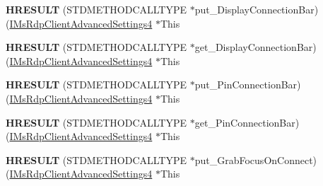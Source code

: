 \begin{DoxyCompactItemize}
\item 
\mbox{\label{struct_m_s_t_s_c_lib_1_1_i_ms_rdp_client_advanced_settings4_vtbl_abb6c86cea366f2b3b51c40e2bc275928}} 
{\bfseries H\+R\+E\+S\+U\+LT} (S\+T\+D\+M\+E\+T\+H\+O\+D\+C\+A\+L\+L\+T\+Y\+PE $\ast$put\+\_\+\+Display\+Connection\+Bar)(\hyperlink{interface_m_s_t_s_c_lib_1_1_i_ms_rdp_client_advanced_settings4}{I\+Ms\+Rdp\+Client\+Advanced\+Settings4} $\ast$This
\item 
\mbox{\label{struct_m_s_t_s_c_lib_1_1_i_ms_rdp_client_advanced_settings4_vtbl_a5d0ce8b420711beeb26fd151c7a28d4d}} 
{\bfseries H\+R\+E\+S\+U\+LT} (S\+T\+D\+M\+E\+T\+H\+O\+D\+C\+A\+L\+L\+T\+Y\+PE $\ast$get\+\_\+\+Display\+Connection\+Bar)(\hyperlink{interface_m_s_t_s_c_lib_1_1_i_ms_rdp_client_advanced_settings4}{I\+Ms\+Rdp\+Client\+Advanced\+Settings4} $\ast$This
\item 
\mbox{\label{struct_m_s_t_s_c_lib_1_1_i_ms_rdp_client_advanced_settings4_vtbl_a5540b928ca77195a141ad56ac59f7108}} 
{\bfseries H\+R\+E\+S\+U\+LT} (S\+T\+D\+M\+E\+T\+H\+O\+D\+C\+A\+L\+L\+T\+Y\+PE $\ast$put\+\_\+\+Pin\+Connection\+Bar)(\hyperlink{interface_m_s_t_s_c_lib_1_1_i_ms_rdp_client_advanced_settings4}{I\+Ms\+Rdp\+Client\+Advanced\+Settings4} $\ast$This
\item 
\mbox{\label{struct_m_s_t_s_c_lib_1_1_i_ms_rdp_client_advanced_settings4_vtbl_a013e7d09f8510a39b9162093591143b5}} 
{\bfseries H\+R\+E\+S\+U\+LT} (S\+T\+D\+M\+E\+T\+H\+O\+D\+C\+A\+L\+L\+T\+Y\+PE $\ast$get\+\_\+\+Pin\+Connection\+Bar)(\hyperlink{interface_m_s_t_s_c_lib_1_1_i_ms_rdp_client_advanced_settings4}{I\+Ms\+Rdp\+Client\+Advanced\+Settings4} $\ast$This
\item 
\mbox{\label{struct_m_s_t_s_c_lib_1_1_i_ms_rdp_client_advanced_settings4_vtbl_a188899f7ec53ab0d46c7779ba3cf789d}} 
{\bfseries H\+R\+E\+S\+U\+LT} (S\+T\+D\+M\+E\+T\+H\+O\+D\+C\+A\+L\+L\+T\+Y\+PE $\ast$put\+\_\+\+Grab\+Focus\+On\+Connect)(\hyperlink{interface_m_s_t_s_c_lib_1_1_i_ms_rdp_client_advanced_settings4}{I\+Ms\+Rdp\+Client\+Advanced\+Settings4} $\ast$This

\end{DoxyCompactItemize}
